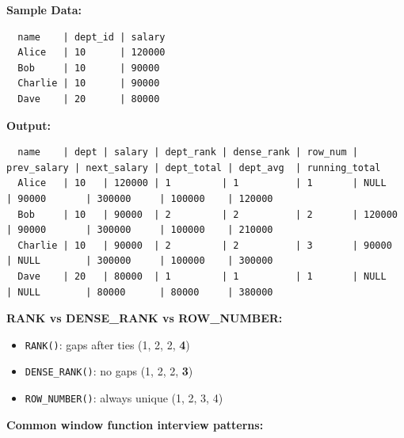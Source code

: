 \documentclass[11pt]{article}
\providecommand{\tightlist}{\setlength{\itemsep}{1pt}\setlength{\parskip}{0pt}}
\begin{document}
\textbf{Sample Data:}

\setcodelang{}

\begin{verbatim}
  name    | dept_id | salary
  Alice   | 10      | 120000
  Bob     | 10      | 90000
  Charlie | 10      | 90000
  Dave    | 20      | 80000
\end{verbatim}

\textbf{Output:}

\setcodelang{}

\begin{verbatim}
  name    | dept | salary | dept_rank | dense_rank | row_num | prev_salary | next_salary | dept_total | dept_avg  | running_total
  Alice   | 10   | 120000 | 1         | 1          | 1       | NULL        | 90000       | 300000     | 100000    | 120000
  Bob     | 10   | 90000  | 2         | 2          | 2       | 120000      | 90000       | 300000     | 100000    | 210000
  Charlie | 10   | 90000  | 2         | 2          | 3       | 90000       | NULL        | 300000     | 100000    | 300000
  Dave    | 20   | 80000  | 1         | 1          | 1       | NULL        | NULL        | 80000      | 80000     | 380000
\end{verbatim}

\textbf{RANK vs DENSE\_RANK vs ROW\_NUMBER:}

\begin{itemize}
\tightlist
\item
  \texttt{RANK()}: gaps after ties (1, 2, 2, \textbf{4})
\item
  \texttt{DENSE\_RANK()}: no gaps (1, 2, 2, \textbf{3})
\item
  \texttt{ROW\_NUMBER()}: always unique (1, 2, 3, 4)
\end{itemize}

\textbf{Common window function interview patterns:}

\end{document}
